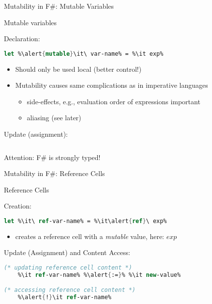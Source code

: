 \documentclass{beamer}
\newcommand{\Blue}[1]{\color{blue}#1\color{black}\xspace}
\begin{document}
\begin{frame}[fragile]{Mutability in F\#: Mutable Variables}

\Blue{Mutable variables}

Declaration:

\begin{lstlisting}[language=FSharp, escapechar=\%]
             let %\alert{mutable}\it\ var-name% = %\it exp% 
\end{lstlisting}

\begin{itemize}
\item Should only be used local (better control!)
\item Mutability causes same complications as in imperative languages
  \begin{itemize}
    \item side-effects, e.g., evaluation order of expressions important
    \item aliasing (see later)
   \end{itemize}
\end{itemize}

\pause 

Update (assignment):
\begin{lstlisting}[language=FSharp, escapechar=\%]
  %\it var-name% <- %\it new-value%
\end{lstlisting}

\pause 

\begin{center}
\alert{Attention: F\# is strongly typed!}
\end{center}

\end{frame}


\begin{frame}[fragile]{Mutability in F\#: Reference Cells}

\Blue{Reference Cells}

Creation:
\begin{lstlisting}[language=FSharp, escapechar=\%]
             let %\it\ ref-var-name% = %\it\alert{ref}\ exp% 
\end{lstlisting}

\begin{itemize}
  \item creates a reference cell with a \emph{mutable} value, here: $exp$
\end{itemize}

\pause 

Update (Assignment) and Content Access:
\begin{lstlisting}[language=FSharp, escapechar=\%]
(* updating reference cell content *)
    %\it ref-var-name% %\alert{:=}% %\it new-value%

(* accessing reference cell content *)
    %\alert{!}\it ref-var-name% 
\end{lstlisting}

\end{frame}
\end{document}
